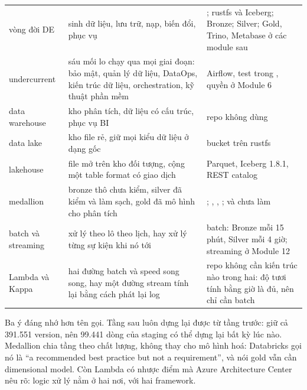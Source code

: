 \begin{xltabular}{\textwidth}{@{}P{3.0cm} L P{4.6cm}@{}}
\toprule
{} &  &  \\
\midrule
\endhead
\bottomrule
\endfoot
vòng đời DE & sinh dữ liệu, lưu trữ, nạp, biến đổi, phục vụ & ; rustfs và Iceberg; Bronze; Silver; Gold, Trino, Metabase ở các module sau \\
undercurrent & sáu mối lo chạy qua mọi giai đoạn: bảo mật, quản lý dữ liệu, DataOps, kiến trúc dữ liệu, orchestration, kỹ thuật phần mềm & Airflow, test trong , quyền ở Module 6 \\
data warehouse & kho phân tích, dữ liệu có cấu trúc, phục vụ BI & repo không dùng \\
data lake & kho file rẻ, giữ mọi kiểu dữ liệu ở dạng gốc & bucket  trên rustfs \\
lakehouse & file mở trên kho đối tượng, cộng một table format có giao dịch & Parquet, Iceberg 1.8.1, REST catalog \\
medallion & bronze thô chưa kiểm, silver đã kiểm và làm sạch, gold đã mô hình cho phân tích & ; , , ;  và  chưa làm \\
batch và streaming & xử lý theo lô theo lịch, hay xử lý từng sự kiện khi nó tới & batch: Bronze mỗi 15 phút, Silver mỗi 4 giờ; streaming ở Module 12 \\
Lambda và Kappa & hai đường batch và speed song song, hay một đường stream tính lại bằng cách phát lại log & repo không cần kiến trúc nào trong hai: độ tươi tính bằng giờ là đủ, nên chỉ cần batch \\
\end{xltabular}

Ba ý đáng nhớ hơn tên gọi. Tầng sau luôn dựng lại được từ tầng trước:  giữ cả 391.551 version, nên 99.441 dòng của staging có thể dựng lại bất kỳ lúc nào. Medallion chia tầng theo chất lượng, không thay cho mô hình hoá: Databricks gọi nó là ``a recommended best practice but not a requirement'', và nói gold vẫn cần dimensional model. Còn Lambda có nhược điểm mà Azure Architecture Center nêu rõ: logic xử lý nằm ở hai nơi, với hai framework.

